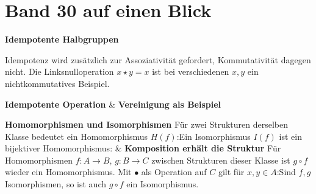 \chapter[Band 30: Idempotente Halbgruppen]{Band 30 auf einen Blick}
\noindent\textbf{Idempotente Halbgruppen}\par\medskip
Idempotenz wird zusätzlich zur Assoziativität gefordert,
Kommutativität dagegen nicht. Die Linksnulloperation \(x\star y=x\)
ist bei verschiedenen \(x,y\) ein nichtkommutatives Beispiel.

\begin{BandUebersicht}
\textbf{Idempotente Operation}
&
\textbf{Vereinigung als Beispiel}
 \\
\addlinespace[.8ex]

\textbf{Homomorphismen und Isomorphismen}
Für zwei Strukturen derselben Klasse bedeutet ein Homomorphismus
\(H(f)\):Ein Isomorphismus \(I(f)\) ist ein bijektiver Homomorphismus:
&
\textbf{Komposition erhält die Struktur}
Für Homomorphismen \(f:A\to B\), \(g:B\to C\) zwischen
Strukturen dieser Klasse ist \(g\circ f\) wieder ein Homomorphismus.
Mit \(\bullet\) als Operation auf \(C\) gilt für \(x,y\in A\):Sind \(f,g\) Isomorphismen, so ist auch \(g\circ f\) ein Isomorphismus.
 \\
\addlinespace[.8ex]
\end{BandUebersicht}

